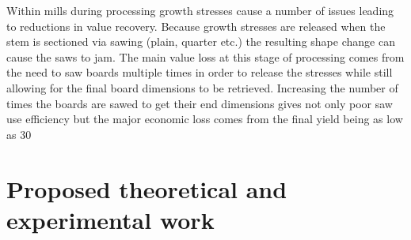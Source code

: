 \documentclass{article}
\begin{document}
Within mills during processing growth stresses cause a number of issues leading
to reductions in value recovery. Because growth stresses are released when the
stem is sectioned via sawing (plain, quarter etc.) the resulting shape change
can cause the saws to jam. The main value loss at this stage of processing comes
from the need to saw boards multiple times in order to release the stresses
while still allowing for the final board dimensions to be retrieved.
Increasing the number of times the boards are sawed to get their end dimensions
gives not only poor saw use efficiency but the major economic loss comes from the
final yield being as low as 30%


\section{Proposed theoretical and experimental work}

%
%
\end{document}
